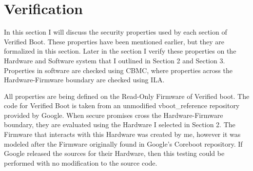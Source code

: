 \documentclass[../report.tex]{subfiles}
\begin{document}
\onehalfspacing

\pagebreak
\section{Verification}\label{sec:Verif}

In this section I will discuss the security properties used by each section of
Verified Boot. These properties have been mentioned earlier, but they are
formalized in this section.
Later in the section I verify these properties on the Hardware and
Software system that I outlined in Section 2 and Section 3.
Properties in software are checked using CBMC, where properties across the Hardware-Firmware boundary are checked using ILA.

All properties are being defined on the Read-Only Firmware of Verified boot.
The code for Verified Boot is taken from an unmodified vboot\_reference repository provided by Google. 
When secure promises cross the Hardware-Firmware boundary, they are evaluated
using the Hardware I selected in Section 2.
The Firmware that interacts with this Hardware was created by me, however it was 
modeled after the Firmware originally found in Google's Coreboot repository. 
If Google released the sources for their Hardware, then this testing could be
performed with no modification to the source code. 
\end{document}
